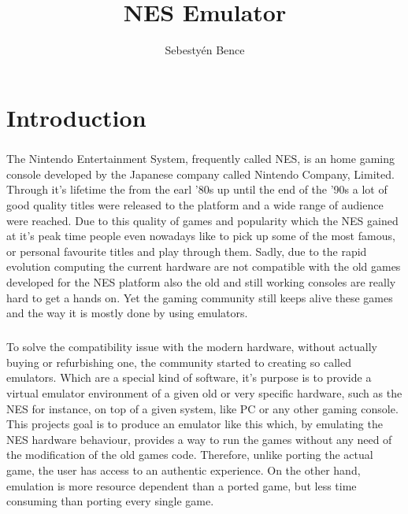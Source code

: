 \documentclass[]{report}
\title{NES Emulator}
\author{Sebestyén Bence}
\begin{document}
\maketitle

\tableofcontents

\clearpage

\chapter{Introduction}

\paragraph{}
The Nintendo Entertainment System, frequently called NES, is an home gaming console developed by the Japanese company called Nintendo Company, Limited.  Through it's lifetime the from the earl '80s up until the end of the '90s a lot of good quality titles were released to the platform and a wide range of audience were reached. Due to this quality of games and  popularity which the NES gained at it's peak time people even nowadays like to pick up some of the most famous, or personal favourite titles and play through them. Sadly, due to the rapid evolution computing the current hardware are not compatible with the old games developed for the NES platform also the old and still working consoles are really hard to get a hands on. Yet the gaming community still keeps alive these games and the way it is mostly done by using emulators.

\paragraph{ }
To solve the compatibility issue with the modern hardware, without actually buying or refurbishing one, the community started to creating so called emulators. Which are a special kind of software, it's purpose is to provide a virtual emulator environment of a given old or very specific hardware, such as the NES for instance, on top of a given system, like PC or any other gaming console. This projects goal is to produce an emulator like this which, by emulating the NES hardware behaviour, provides a way to run the games without any need of the modification of the old games code. Therefore, unlike porting the actual game, the user has access to an authentic experience. On the other hand, emulation is more resource dependent than a ported game, but less time consuming than porting every single game.
\end{document}
